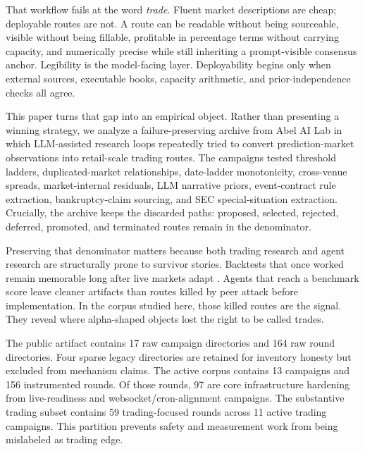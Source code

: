 \documentclass[11pt]{article}
\begin{document}
That workflow fails at the word \emph{trade}. Fluent market descriptions are cheap; deployable routes are not. A route can be readable without being sourceable, visible without being fillable, profitable in percentage terms without carrying capacity, and numerically precise while still inheriting a prompt-visible consensus anchor. Legibility is the model-facing layer. Deployability begins only when external sources, executable books, capacity arithmetic, and prior-independence checks all agree.

This paper turns that gap into an empirical object. Rather than presenting a winning strategy, we analyze a failure-preserving archive from Abel AI Lab in which LLM-assisted research loops repeatedly tried to convert prediction-market observations into retail-scale trading routes. The campaigns tested threshold ladders, duplicated-market relationships, date-ladder monotonicity, cross-venue spreads, market-internal residuals, LLM narrative priors, event-contract rule extraction, bankruptcy-claim sourcing, and SEC special-situation extraction. Crucially, the archive keeps the discarded paths: proposed, selected, rejected, deferred, promoted, and terminated routes remain in the denominator.

Preserving that denominator matters because both trading research and agent research are structurally prone to survivor stories. Backtests that once worked remain memorable long after live markets adapt \citep{Brown1992Surv,BaileyLopezDePrado2014}. Agents that reach a benchmark score leave cleaner artifacts than routes killed by peer attack before implementation. In the corpus studied here, those killed routes are the signal. They reveal where alpha-shaped objects lost the right to be called trades.

The public artifact contains 17 raw campaign directories and 164 raw round directories. Four sparse legacy directories are retained for inventory honesty but excluded from mechanism claims. The active corpus contains 13 campaigns and 156 instrumented rounds. Of those rounds, 97 are core infrastructure hardening from live-readiness and websocket/cron-alignment campaigns. The substantive trading subset contains 59 trading-focused rounds across 11 active trading campaigns. This partition prevents safety and measurement work from being mislabeled as trading edge.
\end{document}
